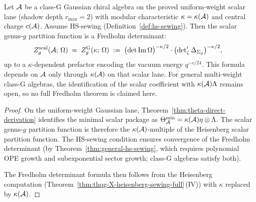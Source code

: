 \begin{theorem}%
\label{thm:thqg-X-class-G-fredholm}%
%
%
Let $\mathcal{A}$ be a class-G Gaussian chiral algebra on the proved
uniform-weight scalar lane
\textup{(}shadow depth $r_{\max} = 2$\textup{)} with
modular characteristic $\kappa = \kappa(\mathcal{A})$ and central
charge $c(\mathcal{A})$. Assume HS-sewing
\textup{(}Definition~\textup{\ref{def:hs-sewing}}\textup{)}.
Then the scalar genus-$g$ partition function is a Fredholm
determinant:
\begin{equation}\label{eq:thqg-X-class-G-formula}
Z_g^{\mathrm{scal}}(\mathcal{A};\,\Omega)
\;=\;
Z_g^{\mathrm{G}}(\kappa;\,\Omega)
\;:=\;
\bigl(\det\operatorname{Im}\Omega\bigr)^{-\kappa/2}
\cdot
\bigl(\det\nolimits'_\zeta\Delta_{\Sigma_g}\bigr)^{-\kappa/2},
\end{equation}
up to a $\kappa$-dependent prefactor encoding the vacuum energy
$q^{-c/24}$. This formula depends on $\mathcal{A}$ only through
$\kappa(\mathcal{A})$ on that scalar lane. For general multi-weight
class-G algebras, the identification of the scalar coefficient with
$\kappa(\mathcal{A})\Lambda$ remains open, so no full Fredholm theorem is
claimed here.
\end{theorem}

\begin{proof}
On the uniform-weight Gaussian lane,
Theorem~\ref{thm:theta-direct-derivation} identifies the minimal
scalar package as
$\Theta_{\mathcal{A}}^{\min} = \kappa(\mathcal{A})\eta\otimes\Lambda$.
The scalar genus-$g$ partition function is therefore the
$\kappa(\mathcal{A})$-multiple of the Heisenberg scalar partition function.
The HS-sewing condition ensures convergence of the Fredholm
determinant (by Theorem~\ref{thm:general-hs-sewing}, which
requires polynomial OPE growth and subexponential sector growth;
class-G algebras satisfy both).

The Fredholm determinant formula then follows from the
Heisenberg computation
(Theorem~\ref{thm:thqg-X-heisenberg-sewing-full}\,(IV))
with $\kappa$ replaced by $\kappa(\mathcal{A})$.
\end{proof}

